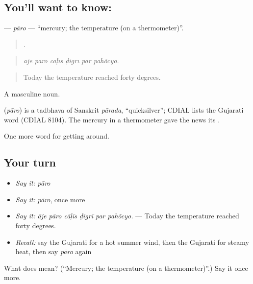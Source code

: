 \subsection*{You'll want to know: }
\textbf{} — \emph{pāro} — \textquotedblleft{}mercury; the temperature (on a thermometer)\textquotedblright{}.

\begin{quote}
     .
\end{quote}

\begin{quote}
\emph{āje pāro cāḷīs ḍigrī par pahõcyo.}
\end{quote}

\begin{quote}
Today the temperature reached forty degrees.
\end{quote}

A masculine noun.

\begin{cousinweb}
\textbf{} (\emph{pāro}) is a tadbhava of Sanskrit \emph{pārada}, \textquotedblleft{}quicksilver\textquotedblright{}; CDIAL lists the Gujarati word (CDIAL 8104). The mercury in a thermometer gave the news its .
\end{cousinweb}

\begin{grammarlens}[title={What you've built}]
One more word for getting around.
\end{grammarlens}

\subsection*{Your turn}
\begin{itemize}
\raggedright
  \item \emph{Say it:} \emph{pāro}
  \item \emph{Say it:} \emph{pāro}, once more
  \item \emph{Say it:} \emph{āje pāro cāḷīs ḍigrī par pahõcyo.} — Today the temperature reached forty degrees.
  \item \emph{Recall:} say the Gujarati for a hot summer wind, then the Gujarati for steamy heat, then say \emph{pāro} again
\end{itemize}

\begin{tcolorbox}[breakable,colback=teal!4,colframe=teal!35!black,title={Before you move on}]
What does  mean? (\textquotedblleft{}Mercury; the temperature (on a thermometer)\textquotedblright{}.) Say it once more.
\end{tcolorbox}

